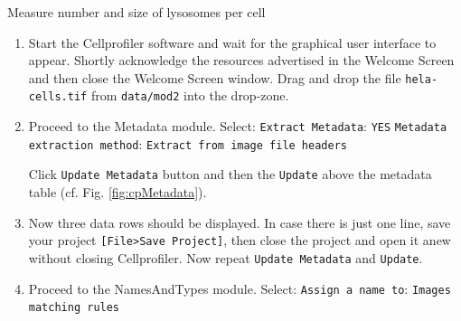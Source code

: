 \begin{taskbox}{Measure number and size of lysosomes per cell}



\begin{enumerate}
\item Start the Cellprofiler software and wait for the graphical user interface to appear. Shortly acknowledge
the resources advertised in the Welcome Screen and then close the Welcome Screen window.
Drag and drop the file \texttt{hela-cells.tif} from \texttt{data/mod2} into the drop-zone.

\item Proceed to the Metadata module. Select: \newline
\texttt{Extract Metadata}: \texttt{YES} \newline
\texttt{Metadata extraction method}: \texttt{Extract from image file headers}

Click \texttt{Update Metadata} button and then the \texttt{Update} above the metadata table (cf. Fig. \ref{fig:cpMetadata}).


	\begin{minipage}[t]{\linewidth}
		\begin{center}
		\medskip
		\label{fig:cpMetadata}
		\end{center}
	\end{minipage}


\item Now three data rows should be displayed. In case there is just one line, save your project \texttt{[File>Save
Project]}, then close the project and open it anew without closing Cellprofiler. Now repeat \texttt{Update
Metadata} and \texttt{Update}.

\item Proceed to the NamesAndTypes module. Select:\newline
\texttt{Assign a name to}: \texttt{Images matching rules}


\end{enumerate}
\end{taskbox}
